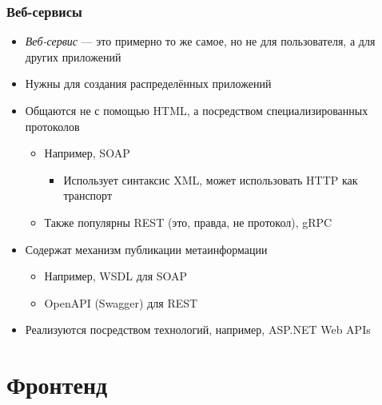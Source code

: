 \documentclass[xetex,mathserif,serif]{beamer}
\begin{document}
    \begin{frame}
        \frametitle{Веб-сервисы}
        \begin{itemize}
            \item \textit{Веб-сервис} --- это примерно то же самое, но не для пользователя, а для других приложений
            \item Нужны для создания распределённых приложений
            \item Общаются не с помощью HTML, а посредством специализированных протоколов
            \begin{itemize}
                \item Например, SOAP
                \begin{itemize}
                    \item Использует синтаксис XML, может использовать HTTP как транспорт
                \end{itemize}
                \item Также популярны REST (это, правда, не протокол), gRPC
            \end{itemize}
            \item Содержат механизм публикации метаинформации
            \begin{itemize}
                \item Например, WSDL для SOAP
                \item OpenAPI (Swagger) для REST
            \end{itemize}
            \item Реализуются посредством технологий, например, ASP.NET Web APIs
        \end{itemize}
    \end{frame}

    \section{Фронтенд}
\end{document}
